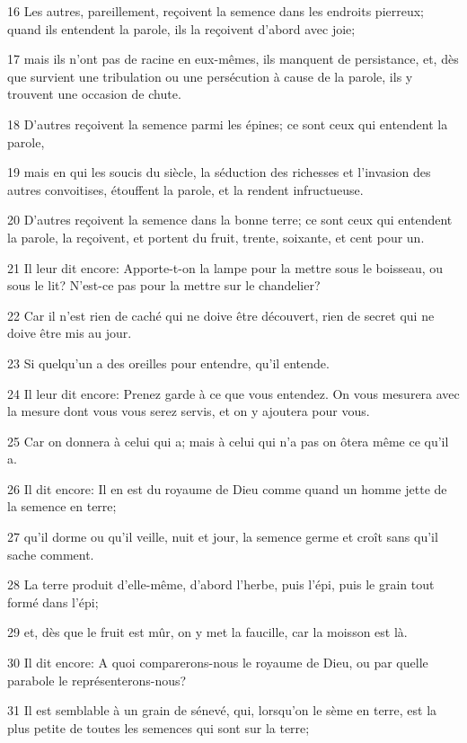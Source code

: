 \par 16 Les autres, pareillement, reçoivent la semence dans les endroits pierreux; quand ils entendent la parole, ils la reçoivent d'abord avec joie;
\par 17 mais ils n'ont pas de racine en eux-mêmes, ils manquent de persistance, et, dès que survient une tribulation ou une persécution à cause de la parole, ils y trouvent une occasion de chute.
\par 18 D'autres reçoivent la semence parmi les épines; ce sont ceux qui entendent la parole,
\par 19 mais en qui les soucis du siècle, la séduction des richesses et l'invasion des autres convoitises, étouffent la parole, et la rendent infructueuse.
\par 20 D'autres reçoivent la semence dans la bonne terre; ce sont ceux qui entendent la parole, la reçoivent, et portent du fruit, trente, soixante, et cent pour un.
\par 21 Il leur dit encore: Apporte-t-on la lampe pour la mettre sous le boisseau, ou sous le lit? N'est-ce pas pour la mettre sur le chandelier?
\par 22 Car il n'est rien de caché qui ne doive être découvert, rien de secret qui ne doive être mis au jour.
\par 23 Si quelqu'un a des oreilles pour entendre, qu'il entende.
\par 24 Il leur dit encore: Prenez garde à ce que vous entendez. On vous mesurera avec la mesure dont vous vous serez servis, et on y ajoutera pour vous.
\par 25 Car on donnera à celui qui a; mais à celui qui n'a pas on ôtera même ce qu'il a.
\par 26 Il dit encore: Il en est du royaume de Dieu comme quand un homme jette de la semence en terre;
\par 27 qu'il dorme ou qu'il veille, nuit et jour, la semence germe et croît sans qu'il sache comment.
\par 28 La terre produit d'elle-même, d'abord l'herbe, puis l'épi, puis le grain tout formé dans l'épi;
\par 29 et, dès que le fruit est mûr, on y met la faucille, car la moisson est là.
\par 30 Il dit encore: A quoi comparerons-nous le royaume de Dieu, ou par quelle parabole le représenterons-nous?
\par 31 Il est semblable à un grain de sénevé, qui, lorsqu'on le sème en terre, est la plus petite de toutes les semences qui sont sur la terre;
